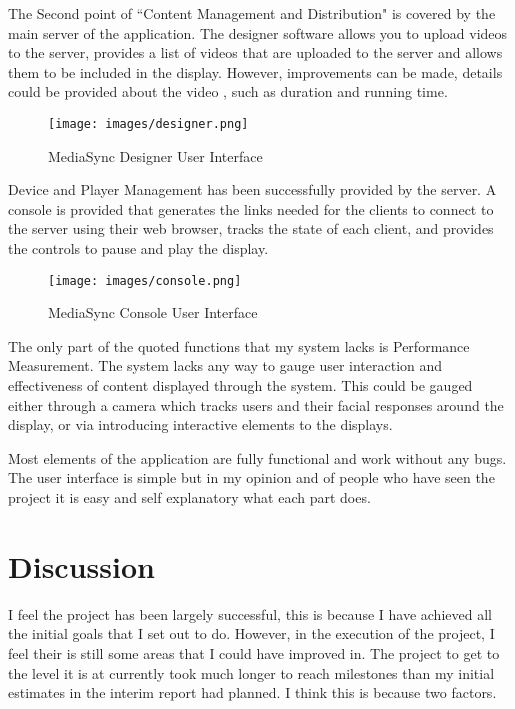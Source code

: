 \documentclass{article}
\begin{document}
The Second point of ``Content Management and Distribution" is covered by the main server of the application. The designer software allows you to upload videos to the server, provides a list of videos that are uploaded to the server and allows them to be included in the display. However, improvements can be made, details could be provided about the video , such as duration and running time.
\begin{figure}[h]
    \centering
    \texttt{[image: images/designer.png]}
    \caption{MediaSync Designer User Interface}
    \label{fig:my_label}
\end{figure}

Device and Player Management has been successfully provided by the server. A console is provided that generates the links needed for the clients to connect to the server using their web browser, tracks the state of each client, and provides the controls to pause and play the display. 

\begin{figure}[h]
    \centering
    \texttt{[image: images/console.png]}
    \caption{MediaSync Console User Interface}
    \label{fig:my_label}
\end{figure}

The only part of the quoted functions that my system lacks is Performance Measurement. The system lacks any way to gauge user interaction and effectiveness of content displayed through the system. This could be gauged either through a camera which tracks users and their facial responses around the display, or via introducing interactive elements to the displays.

Most elements of the application are fully functional and work without any bugs. The user interface is simple but in my opinion and of people who have seen the project it is easy and self explanatory what each part does.
\section{Discussion}
I feel the project has been largely successful, this is because I have achieved all the initial goals that I set out to do. However, in the execution of the project, I feel their is still some areas that I could have improved in. The project to get to the level it is at currently took much longer to reach milestones than my initial estimates in the interim report had planned. I think this is because two factors. 
\end{document}
